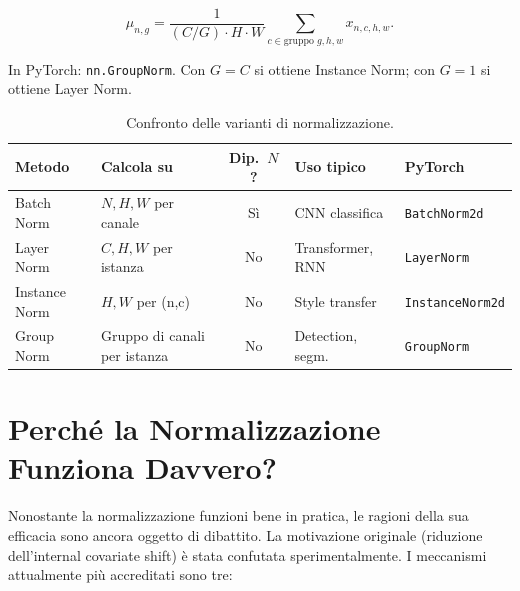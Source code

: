 \begin{equation}
  \mu_{n,g} = \frac{1}{(C/G) \cdot H \cdot W}
               \sum_{c \in \text{gruppo } g, h, w} x_{n,c,h,w}.
\end{equation}

In PyTorch: \texttt{nn.GroupNorm}. Con $G = C$ si ottiene Instance Norm;
con $G = 1$ si ottiene Layer Norm.

\begin{table}[H]
  \centering
  \caption{Confronto delle varianti di normalizzazione.}
  \label{tab:norm_comparison}
  \small
  \begin{tabularx}{\linewidth}{l X c X l}
    \toprule
    \textbf{Metodo} & \textbf{Calcola su} & \textbf{Dip.\ $N$?}
      & \textbf{Uso tipico} & \textbf{PyTorch} \\
    \midrule
    Batch Norm    & $N, H, W$ per canale         & Sì  & CNN classifica       & \texttt{BatchNorm2d} \\
    Layer Norm    & $C, H, W$ per istanza        & No  & Transformer, RNN     & \texttt{LayerNorm} \\
    Instance Norm & $H, W$ per (n,c)             & No  & Style transfer       & \texttt{InstanceNorm2d} \\
    Group Norm    & Gruppo di canali per istanza & No  & Detection, segm.     & \texttt{GroupNorm} \\
    \bottomrule
  \end{tabularx}
\end{table}

\section{Perché la Normalizzazione Funziona Davvero?}
\label{sec:why-works}

Nonostante la normalizzazione funzioni bene in pratica, le ragioni della sua
efficacia sono ancora oggetto di dibattito. La motivazione originale
(riduzione dell'internal covariate shift) è stata confutata sperimentalmente.
I meccanismi attualmente più accreditati sono tre:

